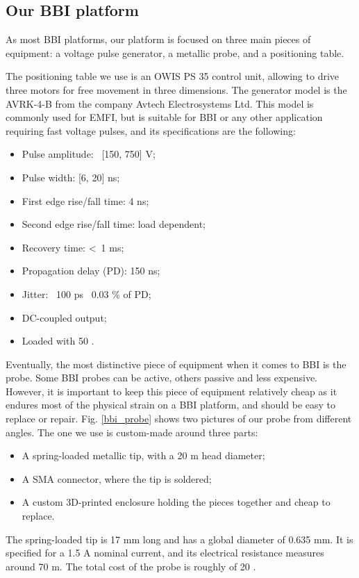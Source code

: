 	\subsection{Our BBI platform}
		As most BBI platforms, our platform is focused on three main pieces of equipment: a voltage pulse generator, a metallic probe, and a positioning table.
		
		The positioning table we use is an OWIS PS 35 control unit, allowing to drive three motors for free movement in three dimensions.
		The generator model is the AVRK-4-B from the company Avtech Electrosystems Ltd.
		This model is commonly used for EMFI, but is suitable for BBI or any other application requiring fast voltage pulses, and its specifications are the following:
		\begin{itemize}
			\item Pulse amplitude: \textpm\ [150, 750] V;
			\item Pulse width: [6, 20] ns;
			\item First edge rise/fall time: 4 ns;
			\item Second edge rise/fall time: load dependent;
			\item Recovery time: \textless\ 1 ms;
			\item Propagation delay (PD): 150 ns;
			\item Jitter: \textpm\ 100 ps \textpm\ 0.03 \% of PD;
			\item DC-coupled output;
			\item Loaded with 50 \textOmega.
		\end{itemize}
		
		Eventually, the most distinctive piece of equipment when it comes to BBI is the probe.
		Some BBI probes can be active, others passive and less expensive.
		However, it is important to keep this piece of equipment relatively cheap as it endures most of the physical strain on a BBI platform, and should be easy to replace or repair.
		Fig. \ref{bbi_probe} shows two pictures of our probe from different angles.
		The one we use is custom-made around three parts:
		\begin{itemize}
			\item A spring-loaded metallic tip, with a 20 \textmu m head diameter;
			\item A SMA connector, where the tip is soldered;
			\item A custom 3D-printed enclosure holding the pieces together and cheap to replace.
		\end{itemize}
		The spring-loaded tip is 17 mm long and has a global diameter of 0.635 mm.
		It is specified for a 1.5 A nominal current, and its electrical resistance measures around 70 m\textOmega.
		The total cost of the probe is roughly of 20 \texteuro.

